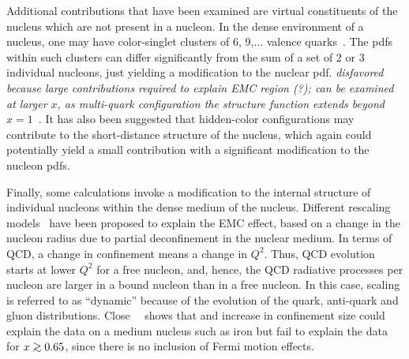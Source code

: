 
Additional contributions that have been examined are virtual constituents of
the nucleus which are not present in a nucleon.  In the dense environment of
a nucleus, one may have color-singlet clusters of 6, 9,... valence
quarks~\cite{jaffe83, pirner11}.  The pdfs within such clusters can differ
significantly from the sum of a set of 2 or 3 individual nucleons, just 
yielding a modification to the nuclear pdf.  \textit{disfavored because
large contributions required to explain EMC region (?); can be examined
at larger $x$, as  multi-quark configuration the structure
function extends beyond $x=1$~\cite{geesaman95, sargsian03, arrington06,
fomin10}}.  It has also been suggested that hidden-color configurations may
contribute to the short-distance structure of the nucleus, which again could
potentially yield a small contribution with a significant modification to the 
nucleon pdfs.  


Finally, some calculations invoke a modification to the internal structure
of individual nucleons within the dense medium of the nucleus.
Different rescaling models~\cite{close83,Nach_pirner, chanfray:1984} have been
proposed to explain the EMC effect, based on a change in the nucleon radius
due to partial deconfinement in the nuclear medium. In terms of QCD, a change
in confinement means a change in $Q^2$. Thus, QCD evolution starts at lower
$Q^2$ for a free nucleon, and, hence, the QCD radiative processes per nucleon
are larger in a bound nucleon than in a free nucleon.
%
In this case, scaling is referred to as ``dynamic'' because of the
evolution of the quark, anti-quark and gluon distributions.
Close~\etal~\cite{close85} shows that and increase in confinement size could
explain the data on a medium nucleus such as iron but fail to explain the data
for $x \gtorder 0.65$, since there is no inclusion of Fermi motion effects.

